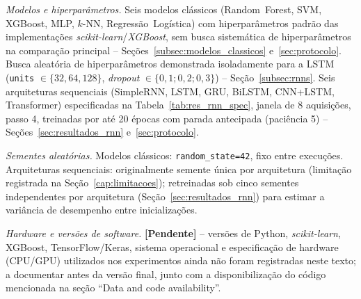 \documentclass[times,final]{elsarticle}
\begin{document}
{\textit{Modelos e hiperparâmetros.} Seis modelos clássicos (Random~Forest, SVM, XGBoost, MLP, $k$-NN, Regressão~Logística) com hiperparâmetros padrão das implementações \textit{scikit-learn}/\textit{XGBoost}, sem busca sistemática de hiperparâmetros na comparação principal -- Seções~\ref{subsec:modelos_classicos} e~\ref{sec:protocolo}. Busca aleatória de hiperparâmetros demonstrada isoladamente para a LSTM (\texttt{units} $\in\{32,64,128\}$, \textit{dropout} $\in\{0{,}1;0{,}2;0{,}3\}$) -- Seção~\ref{subsec:rnns}. Seis arquiteturas sequenciais (SimpleRNN, LSTM, GRU, BiLSTM, CNN+LSTM, Transformer) especificadas na Tabela~\ref{tab:res_rnn_spec}, janela de 8 aquisições, passo 4, treinadas por até 20 épocas com parada antecipada (paciência 5) -- Seções~\ref{sec:resultados_rnn} e~\ref{sec:protocolo}.

\textit{Sementes aleatórias.} Modelos clássicos: \texttt{random\_state=42}, fixo entre execuções. Arquiteturas sequenciais: originalmente semente única por arquitetura (limitação registrada na Seção~\ref{cap:limitacoes}); retreinadas sob cinco sementes independentes por arquitetura (Seção~\ref{sec:resultados_rnn}) para estimar a variância de desempenho entre inicializações.

\textit{Hardware e versões de software.} \textbf{[Pendente]} -- versões de Python, \textit{scikit-learn}, XGBoost, TensorFlow/Keras, sistema operacional e especificação de hardware (CPU/GPU) utilizados nos experimentos ainda não foram registradas neste texto; a documentar antes da versão final, junto com a disponibilização do código mencionada na seção ``Data and code availability''.
}
\end{document}
